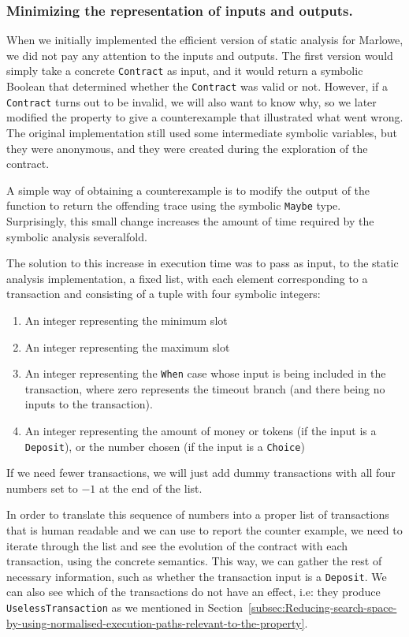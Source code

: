 \documentclass[english,runningheads]{llncs}
\begin{document}
\subsubsection{Minimizing the representation of inputs and outputs.}

When we initially implemented the efficient version of static analysis
for Marlowe, we did not pay any attention to the inputs and outputs.
The first version would simply take a concrete \texttt{Contract}
as input, and it would return a symbolic Boolean that determined whether
the \texttt{Contract} was valid or not. However, if a \texttt{Contract}
turns out to be invalid, we will also want to know why, so we later modified
the property to give a counterexample that illustrated what went wrong.
The original implementation still used some intermediate symbolic
variables, but they were anonymous, and they were created during the
exploration of the contract.

A simple way of obtaining a counterexample is to modify the output
of the function to return the offending trace using the symbolic \texttt{Maybe}
type. Surprisingly, this small change increases the amount of time
required by the symbolic analysis severalfold.

The solution to this increase in execution time was to pass as input, to
the static analysis implementation, a fixed list, with each element corresponding
to a transaction and consisting of a tuple with four symbolic integers:
\begin{enumerate}
\item An integer representing the minimum slot
\item An integer representing the maximum slot
\item An integer representing the \texttt{When} case whose input is being
included in the transaction, where zero represents the timeout branch
(and there being no inputs to the transaction).
\item An integer representing the amount of money or tokens (if the input
is a \texttt{Deposit}), or the number chosen (if the input is a \texttt{Choice})
\end{enumerate}
If we need fewer transactions, we will just add dummy transactions with all four numbers
set to $-1$ at the end of the list.

In order to translate this sequence of numbers into a proper list
of transactions that is human readable and we can use to report the
counter example, we need to iterate through the list and see the evolution
of the contract with each transaction, using the concrete semantics.
This way, we can gather the rest of necessary information, such as
whether the transaction input is a \texttt{Deposit}. We can also see
which of the transactions do not have an effect, i.e: they produce
\texttt{UselessTransaction} as we mentioned in Section~\ref{subsec:Reducing-search-space-by-using-normalised-execution-paths-relevant-to-the-property}.
\end{document}
